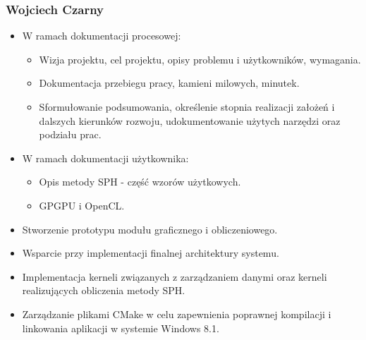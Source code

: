 \documentclass[polish, 12pt]{aghthesis}
\begin{document}
	\subsubsection*{Wojciech Czarny} 
		
		\begin{itemize}
			
			\item W ramach dokumentacji procesowej:
			
				\begin{itemize}
				
					\item Wizja projektu, cel projektu, opisy problemu i użytkowników, wymagania.
					
					\item Dokumentacja przebiegu pracy, kamieni milowych, minutek.
					
					\item Sformułowanie podsumowania, określenie stopnia realizacji założeń i dalszych kierunków rozwoju, udokumentowanie użytych narzędzi oraz podziału prac.
				
				\end{itemize}
			
			\item W ramach dokumentacji użytkownika:
			
				\begin{itemize}
				
					\item Opis metody SPH - część wzorów użytkowych.
					
					\item GPGPU i OpenCL.
				
				\end{itemize}
				
			
			\item Stworzenie prototypu modułu graficznego i obliczeniowego.
			
			\item Wsparcie przy implementacji finalnej architektury systemu.
			
			\item Implementacja kerneli związanych z zarządzaniem danymi oraz kerneli realizujących obliczenia metody SPH.
					
			\item Zarządzanie plikami CMake w celu zapewnienia poprawnej kompilacji i linkowania aplikacji w systemie Windows 8.1.
		
		\end{itemize}
\end{document}
